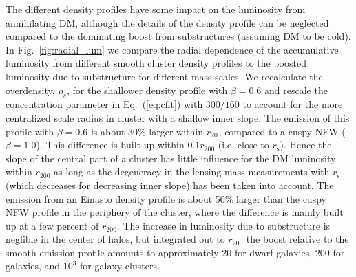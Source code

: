 \documentclass[10pt,aps,pra,reprint,amsmath,amsfonts,amssymb,showpacs,nofootinbib,floatfix]{revtex4-1}
\newcommand{\rmn}{\mathrm}
\newcommand{\s}{\rmn{s}}
\newcommand{\rhos}{\ensuremath{\rho_s}}
\newcommand{\rvir}{r_{200}}
\begin{document}
The different density profiles have some impact on the luminosity from
annihilating DM, although the details of the density profile can be
neglected compared to the dominating boost from substructures
(assuming DM to be cold). In Fig.~\ref{fig:radial_lum} we compare the
radial dependence of the accumulative luminosity from different smooth
cluster density profiles to the boosted luminosity due to substructure
for different mass scales. We recalculate the overdensity, $\rhos$,
for the shallower density profile with $\beta=0.6$ and rescale the
concentration parameter in Eq.~(\ref{eq:cfit}) with $300/160$
\cite{2011ApJ...728L..39N} to account for the more centralized scale
radius in cluster with a shallow inner slope. The emission of this
profile with $\beta=0.6$ is about 30\% larger within $\rvir$ compared
to a cuspy NFW ($\beta=1.0$).  This difference is built up within
$0.1\rvir$ (i.e. close to $r_\s$). Hence the slope of the central part
of a cluster has little influence for the DM luminosity within $\rvir$
as long as the degeneracy in the lensing mass measurements with $r_\s$
(which decreases for decreasing inner slope) has been taken into
account. The emission from an Einasto density profile is about 50\%
larger than the cuspy NFW profile in the periphery of the cluster,
where the difference is mainly built up at a few percent of
$\rvir$. The increase in luminosity due to substructure is neglible in
the center of halos, but integrated out to $\rvir$ the boost relative
to the smooth emission profile amounts to approximately 20 for dwarf
galaxies, $200$ for galaxies, and $10^3$ for galaxy clusters.
\end{document}

